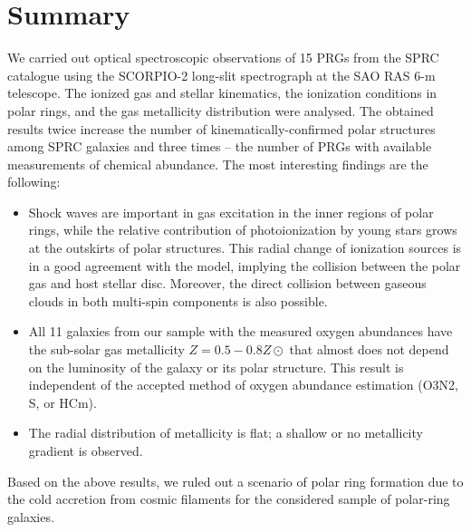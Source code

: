 \documentclass[useAMS,usenatbib]{mnras}
\begin{document}
\section{Summary}
	\label{sec:sum}

We carried out optical spectroscopic observations of 15 PRGs from the SPRC catalogue using the SCORPIO-2  long-slit spectrograph at the SAO RAS 6-m telescope. The ionized gas and stellar kinematics, the ionization conditions in polar rings, and the gas metallicity distribution were analysed. The obtained  results twice increase the number of kinematically-confirmed polar structures among SPRC galaxies and three times -- the number of PRGs with available measurements of chemical abundance. The most interesting findings are the following:

\begin{itemize}
		\item Shock waves are important in gas excitation in the inner regions of polar rings, while the relative contribution of photoionization by young stars grows at the outskirts of polar structures. This radial change of ionization sources is in a good agreement with the \citet{Wakamatsu1993} model, implying the collision between the polar gas and host stellar disc. Moreover, the direct collision between gaseous clouds in both multi-spin components is also possible.
		\item All 11 galaxies from our sample with the measured oxygen abundances have the sub-solar gas metallicity $Z=0.5-0.8 Z\odot$ that almost does not depend on the  luminosity of the galaxy or its polar structure. This result is independent of the accepted method  of oxygen abundance estimation (O3N2, S, or HCm).
		\item The radial distribution of metallicity is flat; a shallow or no metallicity gradient is observed. 
	\end{itemize}
	
Based on the above results, we ruled out a scenario of polar ring formation due to the cold accretion from cosmic filaments for the considered sample of polar-ring galaxies. 
	
	
\end{document}
